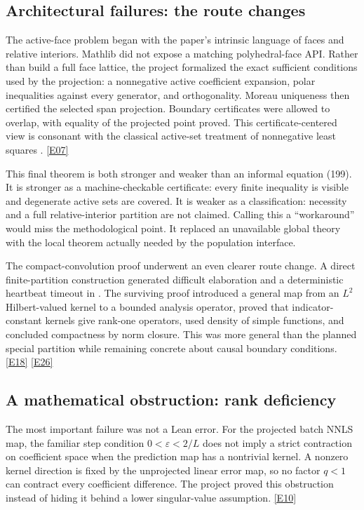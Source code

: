 \documentclass[11pt,a4paper]{article}
\newcommand{\artifact}[1]{\texttt{\detokenize{#1}}}
\newcommand{\ev}[1]{%
  \hyperref[ev:#1]{\textcolor{ReportBlue}{\textsf{\scriptsize[#1]}}}}
\begin{document}
\subsection{Architectural failures: the route changes}

The active-face problem began with the paper's intrinsic language of faces and
relative interiors. Mathlib did not expose a matching polyhedral-face API. Rather
than build a full face lattice, the project formalized the exact sufficient
conditions used by the projection: a nonnegative active coefficient expansion,
polar inequalities against every generator, and orthogonality. Moreau uniqueness
then certified the selected span projection. Boundary certificates were allowed to
overlap, with equality of the projected point proved. This certificate-centered
view is consonant with the classical active-set treatment of nonnegative least
squares \cite{lawson1995}. \ev{E07}

This final theorem is both stronger and weaker than an informal equation (199). It is
stronger as a machine-checkable certificate: every finite inequality is visible and
degenerate active sets are covered. It is weaker as a classification: necessity and
a full relative-interior partition are not claimed. Calling this a ``workaround''
would miss the methodological point. It replaced an unavailable global theory with
the local theorem actually needed by the population interface.

The compact-convolution proof underwent an even clearer route change. A direct
finite-partition construction generated difficult elaboration and a deterministic
heartbeat timeout in \artifact{ScratchT18.lean}. The surviving proof introduced a
general map from an \(L^2\) Hilbert-valued kernel to a bounded analysis operator,
proved that indicator-constant kernels give rank-one operators, used density of
simple functions, and concluded compactness by norm closure. This was more general
than the planned special partition while remaining concrete about causal boundary
conditions. \ev{E18}\ev{E26}

\subsection{A mathematical obstruction: rank deficiency}

The most important failure was not a Lean error. For the projected batch NNLS map,
the familiar step condition \(0<\varepsilon<2/L\) does not imply a strict contraction
on coefficient space when the prediction map has a nontrivial kernel. A nonzero
kernel direction is fixed by the unprojected linear error map, so no factor \(q<1\)
can contract every coefficient difference. The project proved this obstruction
instead of hiding it behind a lower singular-value assumption. \ev{E10}
\end{document}
